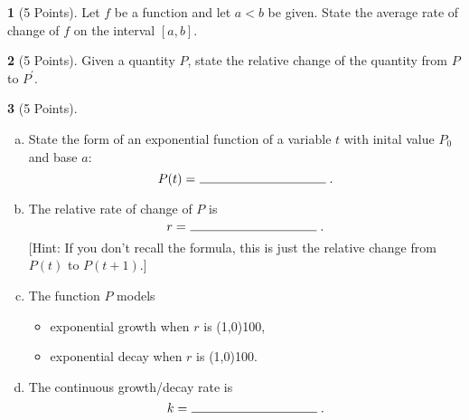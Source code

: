 \documentclass[12pt]{amsart}
\theoremstyle{definition}
\newtheorem{thm}{}
\theoremstyle{definition}
\begin{document}
\begin{thm}[5 Points]
  Let $f$ be a function and let $a < b$ be given.
  State the average rate of change of $f$ on the interval $[a,b]$.
  \vspace{2in}
\end{thm}

\newpage

\begin{thm}[5 Points]
  Given a quantity $P$, state the relative change of the quantity from $P$ to $P^\prime$.
  \vspace{2in}
\end{thm}

\begin{thm}[5 Points]
  \begin{enumerate}[(a)]
  \item
    State the form of an exponential function of a variable $t$ with inital value $P_0$ and base $a$:
    \vspace{0.15in}
    $$P(t) =\ \line(1,0){100}.$$
  \item
    The relative rate of change of $P$ is 
    \vspace{0.3in}
    $$r =\ \line(1,0){100}.$$
    [Hint: If you don't recall the formula, this is just the relative change from $P(t)$ to $P(t + 1)$.]\\
  \item
    The function $P$ models 
    \begin{itemize}
    \item
      \vspace{0.15in}
      exponential growth when $r$ is \line(1,0){100},
      \vspace{0.15in}
    \item
      exponential decay when $r$ is \line(1,0){100}.
    \end{itemize}
  \item
    The continuous growth/decay rate is
    \vspace{.15in}
    $$k =\ \line(1,0){100}.$$
  \end{enumerate}
\end{thm}
\end{document}
